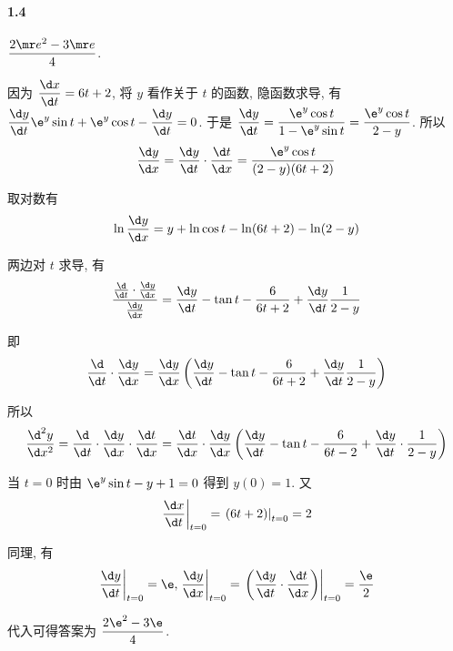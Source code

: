 \paragraph*{1.4} $\dfrac{2\mr e^2-3\mr e}{4}$.

因为 $\dfrac{\d x}{\d t}=6t+2$, 将 $y$ 看作关于 $t$ 的函数, 隐函数求导, 有 $\dfrac{\d y}{\d t}\e^{y}\sin t+\e^{y}\cos t-\dfrac{\d y}{\d t}=0$. 于是 $\dfrac{\d y}{\d t}=\dfrac{\e^y\cos t}{1-\e^y\sin t}=\dfrac{\e^y\cos t}{2-y}$. 所以
\[
	\dfrac{\d y}{\d x}=\dfrac{\d y}{\d t}\cdot\dfrac{\d t}{\d x}=\dfrac{\e^y\cos t}{(2-y)(6t+2)}
\]

取对数有
\[
	\ln\dfrac{\d y}{\d x}=y+\ln\cos t-\ln(6t+2)-\ln(2-y)
\]

两边对 $t$ 求导, 有
\[
	\dfrac{\frac{\d}{\d t}\cdot \frac{\d y}{\d x}}{\frac{\d y}{\d x}}=\dfrac{\d y}{\d t}-\tan t-\dfrac{6}{6t+2}+\dfrac{\d y}{\d t}\dfrac{1}{2-y}
\]

即
\[
	\dfrac{\d}{\d t}\cdot\dfrac{\d y}{\d x}=\dfrac{\d y}{\d x}\left(\dfrac{\d y}{\d t}-\tan t-\dfrac{6}{6t+2}+\dfrac{\d y}{\d t}\dfrac{1}{2-y}\right)
\]

所以
\[
	\dfrac{\d^2 y}{\d x^2}=\dfrac{\d}{\d t}\cdot\dfrac{\d y}{\d x}\cdot\dfrac{\d t}{\d x}=\dfrac{\d t}{\d x}\cdot\dfrac{\d y}{\d x}\left(\dfrac{\d y}{\d t}-\tan t-\dfrac{6}{6t-2}+\dfrac{\d y}{\d t}\cdot\dfrac{1}{2-y}\right)
\]

当 $t=0$ 时由 $\e^y\sin t-y+1=0$ 得到 $y(0)=1$. 又
\[
	\left.\dfrac{\d x}{\d t}\right|_{t=0}=\left.(6t+2)\right|_{t=0}=2
\] 

同理, 有 
\[
	\left.\dfrac{\d y}{\d t}\right|_{t=0}=\e, \left.\dfrac{\d y}{\d x}\right|_{t=0}=\left.\left(\dfrac{\d y}{\d t}\cdot \dfrac{\d t}{\d x}\right)\right|_{t=0}=\dfrac{\e}{2}
\]

代入可得答案为 $\dfrac{2\e^2-3\e}{4}$.